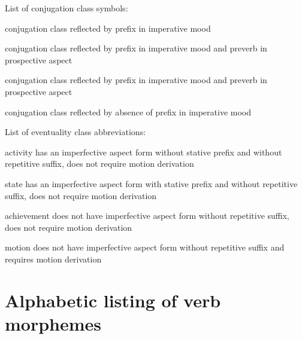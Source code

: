 \documentclass[12pt,letterpaper,oneside,article]{memoir}
\begin{document}
\vspace{\baselineskip}
\noindent
List of conjugation class symbols:
\begin{description}[font={\normalfont}, style=sameline, labelindent=\parindent, labelwidth=3em, leftmargin=!]
\item[\fm{n}]	 conjugation class\newline
		reflected by  prefix in imperative mood
\item[\fm{g̱}]	 conjugation class\newline
		reflected by  prefix in imperative mood\newline
		and  preverb in prospective aspect
\item[\fm{g}]	 conjugation class\newline
		reflected by  prefix in imperative mood\newline
		and  preverb in prospective aspect
\item[\fm{∅}]	 conjugation class\newline
		reflected by absence of prefix in imperative mood
\end{description}

\vspace{\baselineskip}
\noindent
List of eventuality class abbreviations:
\begin{description}[font={\normalfont}, style=sameline, labelindent=\parindent, labelwidth=3em, leftmargin=!]
\item[act]	activity\newline
		has an imperfective aspect form without stative prefix
		and without repetitive suffix, does not require motion derivation
\item[state]	state\newline
		has an imperfective aspect form with stative prefix
		and without repetitive suffix, does not require motion derivation
\item[ach]	achievement\newline
		does not have imperfective aspect form without repetitive suffix,
		does not require motion derivation
\item[mot]	motion\newline
		does not have imperfective aspect form without repetitive suffix
		and requires motion derivation
\end{description}

\clearpage
\section{Alphabetic listing of verb morphemes}\label{sec:alphalist}
\end{document}
